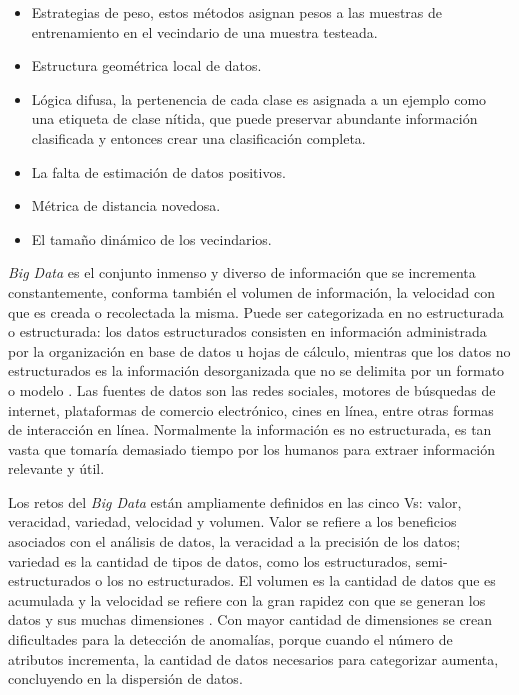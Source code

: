   \begin{itemize}
  	\item Estrategias de peso, estos m\'{e}todos asignan pesos a las muestras de entrenamiento en el vecindario de una muestra testeada.
  	\item Estructura geom\'{e}trica local de datos.
  	\item L\'{o}gica difusa, la pertenencia de cada clase es asignada a un ejemplo como una etiqueta de clase n\'{i}tida, que puede preservar abundante informaci\'{o}n clasificada y entonces crear una clasificaci\'{o}n completa.
  	\item La falta de estimaci\'{o}n de datos positivos.
  	\item M\'{e}trica de distancia novedosa.
  	\item El tama\~{n}o din\'{a}mico de los vecindarios.
  \end{itemize}

  \textit{Big Data} es el conjunto inmenso y diverso de informaci\'{o}n que se incrementa constantemente, conforma tambi\'{e}n el volumen de informaci\'{o}n, la velocidad con que es creada o recolectada la misma. Puede ser categorizada en no estructurada o estructurada: los datos estructurados consisten en informaci\'{o}n administrada por la organizaci\'{o}n en base de datos u hojas de c\'{a}lculo, mientras que los datos no estructurados es la informaci\'{o}n desorganizada que no se delimita por un formato o modelo \cite{13}. Las fuentes de datos son las redes sociales, motores de b\'{u}squedas de internet, plataformas de comercio electr\'{o}nico, cines en l\'{i}nea, entre otras formas de interacci\'{o}n en l\'{i}nea. Normalmente la informaci\'{o}n es no estructurada, es tan vasta que tomar\'{i}a demasiado tiempo por los humanos para extraer informaci\'{o}n relevante y \'{u}til.
  
  Los retos del \textit{Big Data} est\'{a}n ampliamente definidos en las cinco Vs: valor, veracidad, variedad, velocidad y volumen. Valor se refiere a los beneficios asociados con el an\'{a}lisis de datos, la veracidad a la precisi\'{o}n de los datos; variedad es la cantidad de tipos de datos, como los estructurados, semi-estructurados o los no estructurados. El volumen es la cantidad de datos que es acumulada y la velocidad se refiere con la gran rapidez con que se generan los datos y sus muchas dimensiones \cite{14}. Con mayor cantidad de dimensiones se crean dificultades para la detecci\'{o}n de anomal\'{i}as, porque cuando el n\'{u}mero de atributos incrementa, la cantidad de datos necesarios para categorizar aumenta, concluyendo en la dispersi\'{o}n de datos.
  
